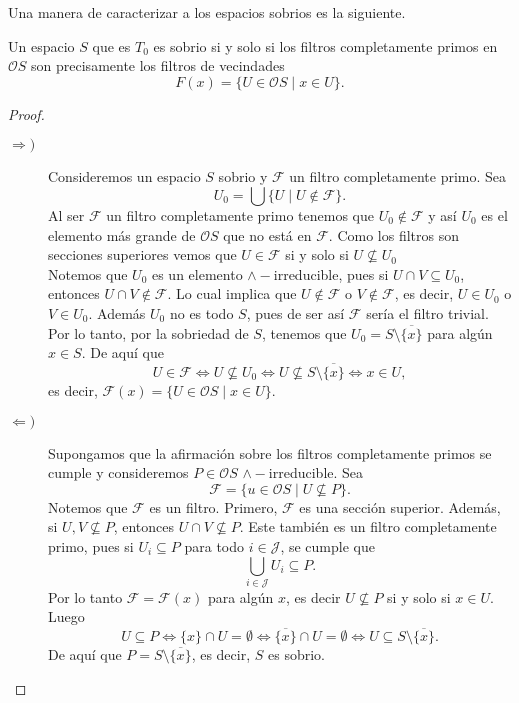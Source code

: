 Una manera de caracterizar a los espacios sobrios es la siguiente.

\begin{thm}\label{Fprimo}
Un espacio $S$ que es $T_0$ es sobrio si y solo si los filtros completamente primos en $\mathcal{O}S$ son precisamente los filtros de vecindades
\[
F(x)=\{U\in \mathcal{O}S\mid x\in U\}.
\]
\end{thm}

\begin{proof}
\begin{description}
    \item[$\Rightarrow )$] Consideremos un espacio $S$ sobrio y $\mathcal{F}$ un filtro completamente primo. Sea 
    \[
    U_0=\bigcup\{U\mid U\notin \mathcal{F}\}.
    \]
    Al ser $\mathcal{F}$ un filtro completamente primo tenemos que $U_0\notin \mathcal{F}$ y así $U_0$ es el elemento más grande de $\mathcal{O}S$ que no está en $\mathcal{F}$. Como los filtros son secciones superiores vemos que $U\in \mathcal{F}$ si y solo si $U\nsubseteq U_0$\\

    \noindent
    Notemos que $U_0$ es un elemento $\wedge-$irreducible, pues si $U\cap V\subseteq U_0$, entonces $U\cap V\notin \mathcal{F}$. Lo cual implica que $U\notin\mathcal{F}$ o $V\notin\mathcal{F}$, es decir, $U\in U_0$ o $V\in U_0$. Además $U_0$ no es todo $S$, pues de ser así $\mathcal{F}$ sería el filtro trivial.\\

    \noindent
    Por lo tanto, por la sobriedad de $S$, tenemos que $U_0=S\setminus \overline{\{x\}}$ para algún $x\in S$. De aquí que 
    \[
    U\in \mathcal{F}\Leftrightarrow U\nsubseteq U_0\Leftrightarrow U\nsubseteq S\setminus \overline{\{x\}}\Leftrightarrow x\in U,
    \]
    es decir, $\mathcal{F}(x)=\{U\in\mathcal{O}S\mid x\in U\}$.
    \item[$\Leftarrow )$] Supongamos que la afirmación sobre los filtros completamente primos se cumple y consideremos $P\in\mathcal{O}S$ $\wedge-$irreducible. Sea 
    \[
    \mathcal{F}=\{u\in \mathcal{O}S\mid U\nsubseteq P\}.
    \]
    Notemos que $\mathcal{F}$ es un filtro. Primero, $\mathcal{F}$ es una sección superior. Además, si $U, V\nsubseteq P$, entonces $U\cap V\nsubseteq P$. Este también es un filtro completamente primo, pues si $U_i\subseteq P$ para todo $i\in \mathcal{J}$, se cumple que 
    \[
    \bigcup_{i\in\mathcal{J}}U_i\subseteq P.
    \]
    Por lo tanto $\mathcal{F}=\mathcal{F}(x)$ para algún $x$, es decir $U\nsubseteq P$ si y solo si $x\in U$. Luego
    \[
    U\subseteq P\Leftrightarrow \{x\}\cap U=\emptyset\Leftrightarrow \overline{\{x\}}\cap U=\emptyset\Leftrightarrow U\subseteq S\setminus \overline{\{x\}}.
    \]
    De aquí que $P=S\setminus \overline{\{x\}}$, es decir, $S$ es sobrio.
\end{description}    
\end{proof}

